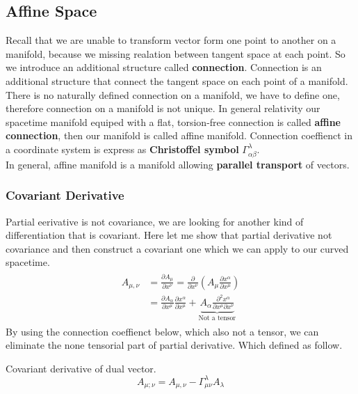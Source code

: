 \documentclass[12pt]{article}
\theoremstyle{mystyle}{\newtheorem{definition}{Definition}[section]}
\theoremstyle{mystyle}{\newtheorem{theorem}[definition]{Theorem}}
\theoremstyle{mystyle}{\newtheorem*{remark}{Remark}}
\theoremstyle{mystyle}{\newtheorem*{example}{Example}}
\theoremstyle{mystyle}{\newtheorem*{examples}{Examples}}
\theoremstyle{cstyle}{\newtheorem*{cthm}{}}
\begin{document}
\subsection{Affine Space}
Recall that we are unable to transform vector form one point to another on a manifold,
because we missing realation between tangent space at each point. So we introduce an additional structure called \textbf{connection}.
Connection is an additional structure that connect the tangent space on each point of a manifold.
There is no naturally defined connection on a manifold, we have to define one, therefore connection on a manifold is not unique.
In general relativity our spacetime manifold equiped with a flat, torsion-free connection is called \textbf{affine connection}, then
our manifold is called affine manifold. Connection coeffienct in a coordinate system is express as \textbf{Christoffel symbol} \(\Gamma^{\lambda}_{\alpha\beta}\).\\
In general, affine manifold is a manifold allowing \textbf{parallel transport} of vectors.

\subsubsection{Covariant Derivative}
Partial eerivative is not covariance, we are looking for another kind of differentiation that is covariant.
Here let me show that partial derivative not covariance and then construct a covariant one which we can apply to our curved spacetime.
\begin{align*}
  \begin{split}
    A_{\mu,\nu} &= \frac{\partial A_{\mu}}{\partial x^{\nu}} = \frac{\partial}{\partial x^{\nu}}
    \left( A_{\mu}\frac{\partial x^{\alpha}}{\partial x^{\mu}}\right)\\
    &= \frac{\partial A_\alpha}{\partial x^{\mu}}\frac{\partial x^{\alpha}}{\partial x^{\mu}}+
    \underbrace{A_{\alpha} \frac{\partial^2 x^{\alpha}}{\partial x^{\mu} \partial x^{\nu}}}_\text{Not a tensor}
  \end{split}
\end{align*}
By using the connection coeffienct below, which also not a tensor, we can eliminate the none tensorial part of partial derivative.
Which defined as follow.
\begin{definition}
  Covariant derivative of dual vector.
  \[A_{\mu;\nu} = A_{\mu,\nu} - \Gamma^{\lambda}_{\mu\nu}A_{\lambda}\]
\end{definition}
\end{document}
